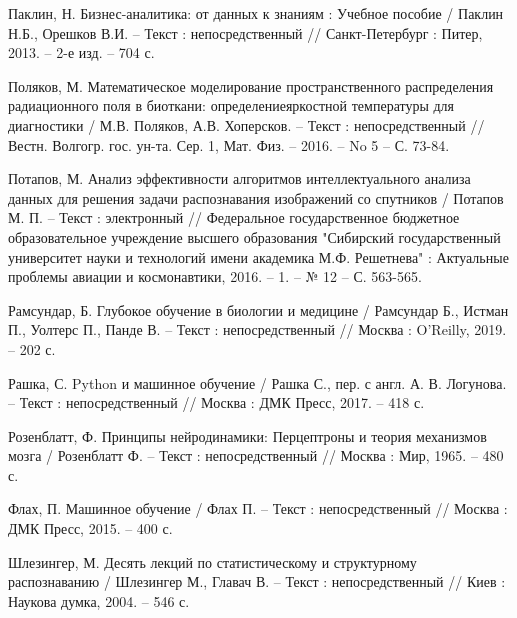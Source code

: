 \begin{thebibliography}{3}
	 Паклин, Н. Бизнес-аналитика: от данных к знаниям : Учебное пособие / Паклин Н.Б., Орешков В.И. -- Текст : непосредственный // Санкт-Петербург : Питер, 2013. -- 2-е изд. -- 704 с.
	
	 Поляков, М. Математическое моделирование пространственного распределения радиационного поля в биоткани: определениеяркостной температуры для диагностики / М.В. Поляков, А.В. Хоперсков. -- Текст : непосредственный // Вестн. Волгогр. гос. ун-та. Сер. 1, Мат. Физ. -- 2016. -- No 5 -- С. 73-84.
	
	 Потапов, М. Анализ эффективности алгоритмов интеллектуального анализа данных для решения задачи распознавания изображений со спутников / Потапов М. П. -- Текст : электронный // Федеральное государственное бюджетное образовательное учреждение высшего образования "Сибирский государственный университет науки и технологий имени академика М.Ф. Решетнева" : Актуальные проблемы авиации и космонавтики, 2016. -- 1. -- № 12 -- С. 563-565.	
	
	 Рамсундар, Б. Глубокое обучение в биологии и медицине / Рамсундар Б., Истман П., Уолтерс П., Панде В. -- Текст : непосредственный // Москва : O'Reilly, 2019. -- 202 с.		
	
	 Рашка, С. Python и машинное обучение / Рашка С., пер. с англ. А. В. Логунова. -- Текст : непосредственный // Москва : ДМК Пресс, 2017. -- 418 с.		
	
	 Розенблатт, Ф. Принципы нейродинамики: Перцептроны и теория механизмов мозга / Розенблатт Ф. -- Текст : непосредственный // Москва : Мир, 1965. -- 480 с.	
	
	 Флах, П. Машинное обучение / Флах П. -- Текст : непосредственный // Москва : ДМК Пресс, 2015. -- 400 с.
	
	 Шлезингер, М. Десять лекций по статистическому и структурному распознаванию / Шлезингер М., Главач В. -- Текст : непосредственный // Киев : Наукова думка, 2004. -- 546 с.
	
\end{thebibliography}